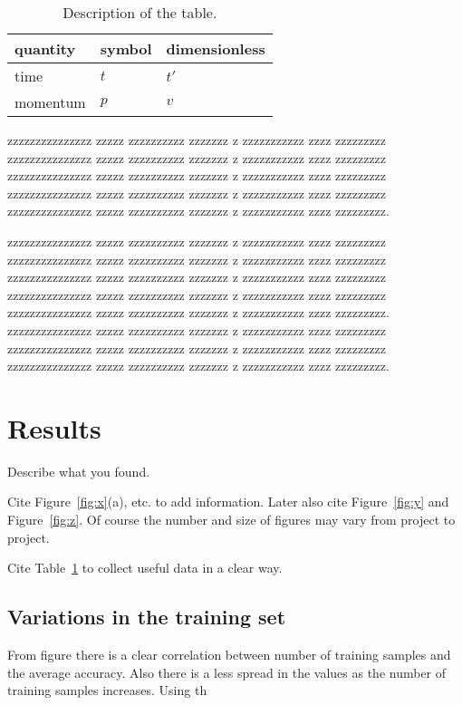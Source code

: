 \documentclass[prl,twocolumn]{revtex4-1}
\begin{document}
  
\begin{table}[!b]
\begin{center}
\begin{tabular}{lll}
quantity & symbol & dimensionless \\
\hline
time & $t$ & $t'$  \\
momentum & $p$ & $v$
\end{tabular}
\end{center}
\caption{Description of the table.}
\label{tab:1}
\end{table}


  
  zzzzzzzzzzzzzzz zzzzz zzzzzzzzzz zzzzzzz z zzzzzzzzzzz zzzz zzzzzzzzz
  zzzzzzzzzzzzzzz zzzzz zzzzzzzzzz zzzzzzz z zzzzzzzzzzz zzzz zzzzzzzzz
  zzzzzzzzzzzzzzz zzzzz zzzzzzzzzz zzzzzzz z zzzzzzzzzzz zzzz zzzzzzzzz
  zzzzzzzzzzzzzzz zzzzz zzzzzzzzzz zzzzzzz z zzzzzzzzzzz zzzz zzzzzzzzz
  zzzzzzzzzzzzzzz zzzzz zzzzzzzzzz zzzzzzz z zzzzzzzzzzz zzzz zzzzzzzzz.


  zzzzzzzzzzzzzzz zzzzz zzzzzzzzzz zzzzzzz z zzzzzzzzzzz zzzz zzzzzzzzz
  zzzzzzzzzzzzzzz zzzzz zzzzzzzzzz zzzzzzz z zzzzzzzzzzz zzzz zzzzzzzzz
  zzzzzzzzzzzzzzz zzzzz zzzzzzzzzz zzzzzzz z zzzzzzzzzzz zzzz zzzzzzzzz
  zzzzzzzzzzzzzzz zzzzz zzzzzzzzzz zzzzzzz z zzzzzzzzzzz zzzz zzzzzzzzz
  zzzzzzzzzzzzzzz zzzzz zzzzzzzzzz zzzzzzz z zzzzzzzzzzz zzzz zzzzzzzzz.
  zzzzzzzzzzzzzzz zzzzz zzzzzzzzzz zzzzzzz z zzzzzzzzzzz zzzz zzzzzzzzz
  zzzzzzzzzzzzzzz zzzzz zzzzzzzzzz zzzzzzz z zzzzzzzzzzz zzzz zzzzzzzzz
  zzzzzzzzzzzzzzz zzzzz zzzzzzzzzz zzzzzzz z zzzzzzzzzzz zzzz zzzzzzzzz.
 


\section{Results}


Describe what you found.

Cite Figure~\ref{fig:x}(a), etc. to add information. Later also cite Figure~\ref{fig:y} and  Figure~\ref{fig:z}. Of course the number and size of figures may vary from project to project.

Cite Table~\ref{tab:1} to collect useful data in a clear way.

\subsection{Variations in the training set}
From figure 
there is a clear correlation between number of training samples and the average accuracy. Also there is a less spread in the values as the number of training samples increases. Using th
\end{document}
